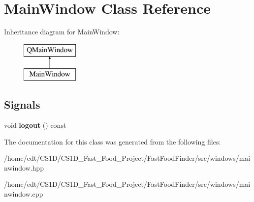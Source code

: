 \hypertarget{classMainWindow}{\section{Main\-Window Class Reference}
\label{classMainWindow}
}
Inheritance diagram for Main\-Window\-:\begin{figure}[H]
\begin{center}
\leavevmode
\includegraphics[height=2.000000cm]{classMainWindow}
\end{center}
\end{figure}
\subsection*{Signals}
\begin{DoxyCompactItemize}
\item 
\hypertarget{classMainWindow_a5ece302f5e733ada9b8f1a53a7f7a643}{void {\bfseries logout} () const }\label{classMainWindow_a5ece302f5e733ada9b8f1a53a7f7a643}

\end{DoxyCompactItemize}


The documentation for this class was generated from the following files\-:\begin{DoxyCompactItemize}
\item 
/home/edt/\-C\-S1\-D/\-C\-S1\-D\-\_\-\-Fast\-\_\-\-Food\-\_\-\-Project/\-Fast\-Food\-Finder/src/windows/mainwindow.\-hpp\item 
/home/edt/\-C\-S1\-D/\-C\-S1\-D\-\_\-\-Fast\-\_\-\-Food\-\_\-\-Project/\-Fast\-Food\-Finder/src/windows/mainwindow.\-cpp\end{DoxyCompactItemize}
